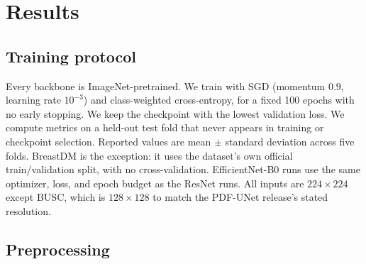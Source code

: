 \documentclass[11pt]{article}
\begin{document}
\begin{table}[htbp]
  \centering
  \caption{Dataset summary.}
  \label{tab:datasets}
\end{table}

\section{Results}

\subsection{Training protocol}

Every backbone is ImageNet-pretrained. We train with SGD (momentum $0.9$,
learning rate $10^{-3}$) and class-weighted cross-entropy, for a fixed 100
epochs with no early stopping. We keep the checkpoint with the lowest
validation loss. We compute metrics on a held-out test fold that never
appears in training or checkpoint selection. Reported values are mean $\pm$
standard deviation across five folds. BreastDM is the exception: it uses
the dataset's own official train/validation split, with no cross-validation.
EfficientNet-B0 runs use the same optimizer, loss, and epoch budget as the
ResNet runs. All inputs are $224\times224$ except BUSC, which is
$128\times128$ to match the PDF-UNet release's stated resolution.

\subsection{Preprocessing}
\label{sec:preprocessing}
\end{document}
